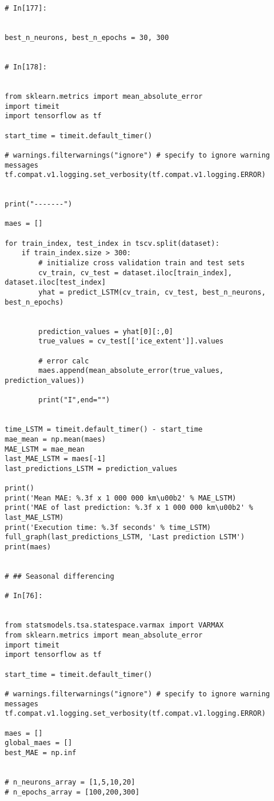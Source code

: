 \begin{verbatim}
# In[177]:


best_n_neurons, best_n_epochs = 30, 300


# In[178]:


from sklearn.metrics import mean_absolute_error
import timeit
import tensorflow as tf

start_time = timeit.default_timer()

# warnings.filterwarnings("ignore") # specify to ignore warning messages
tf.compat.v1.logging.set_verbosity(tf.compat.v1.logging.ERROR)


print("-------")

maes = []

for train_index, test_index in tscv.split(dataset):
    if train_index.size > 300:
        # initialize cross validation train and test sets
        cv_train, cv_test = dataset.iloc[train_index], dataset.iloc[test_index]
        yhat = predict_LSTM(cv_train, cv_test, best_n_neurons, best_n_epochs)


        prediction_values = yhat[0][:,0]
        true_values = cv_test[['ice_extent']].values

        # error calc
        maes.append(mean_absolute_error(true_values, prediction_values))

        print("I",end="")
    

time_LSTM = timeit.default_timer() - start_time
mae_mean = np.mean(maes)
MAE_LSTM = mae_mean
last_MAE_LSTM = maes[-1]
last_predictions_LSTM = prediction_values

print()
print('Mean MAE: %.3f x 1 000 000 km\u00b2' % MAE_LSTM)
print('MAE of last prediction: %.3f x 1 000 000 km\u00b2' % last_MAE_LSTM)
print('Execution time: %.3f seconds' % time_LSTM)
full_graph(last_predictions_LSTM, 'Last prediction LSTM')
print(maes)


# ## Seasonal differencing

# In[76]:


from statsmodels.tsa.statespace.varmax import VARMAX
from sklearn.metrics import mean_absolute_error
import timeit
import tensorflow as tf

start_time = timeit.default_timer()

# warnings.filterwarnings("ignore") # specify to ignore warning messages
tf.compat.v1.logging.set_verbosity(tf.compat.v1.logging.ERROR)

maes = []
global_maes = []
best_MAE = np.inf


# n_neurons_array = [1,5,10,20]
# n_epochs_array = [100,200,300]


\end{verbatim}
